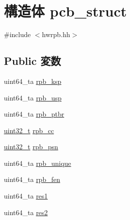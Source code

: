 \hypertarget{structLinux_1_1pcb__struct}{
\section{構造体 pcb\_\-struct}
\label{structLinux_1_1pcb__struct}
}


{\ttfamily \#include $<$hwrpb.hh$>$}\subsection*{Public 変数}
\begin{DoxyCompactItemize}
\item 
uint64\_\-ta \hyperlink{structLinux_1_1pcb__struct_a40e22c605b327545d8d85f26c35d6a65}{rpb\_\-ksp}
\item 
uint64\_\-ta \hyperlink{structLinux_1_1pcb__struct_aba4e265000058830dea16c4d418225ed}{rpb\_\-usp}
\item 
uint64\_\-ta \hyperlink{structLinux_1_1pcb__struct_a427d9bed92f47bb2299658856647a707}{rpb\_\-ptbr}
\item 
\hyperlink{Type_8hh_a435d1572bf3f880d55459d9805097f62}{uint32\_\-t} \hyperlink{structLinux_1_1pcb__struct_ae29ed3c93382c07a44891963ee64d300}{rpb\_\-cc}
\item 
\hyperlink{Type_8hh_a435d1572bf3f880d55459d9805097f62}{uint32\_\-t} \hyperlink{structLinux_1_1pcb__struct_abaed7481c678c94351f02c3eb258d776}{rpb\_\-psn}
\item 
uint64\_\-ta \hyperlink{structLinux_1_1pcb__struct_aa3078038e064384816ca56e2c5682fcc}{rpb\_\-unique}
\item 
uint64\_\-ta \hyperlink{structLinux_1_1pcb__struct_a0a7b23b7e024ca17fd9079b000af955a}{rpb\_\-fen}
\item 
uint64\_\-ta \hyperlink{structLinux_1_1pcb__struct_aa49aada80eb6554b8d685cfdf53b2071}{res1}
\item 
uint64\_\-ta \hyperlink{structLinux_1_1pcb__struct_aa4b9280145b18786f6835f0c34549302}{res2}
\end{DoxyCompactItemize}


